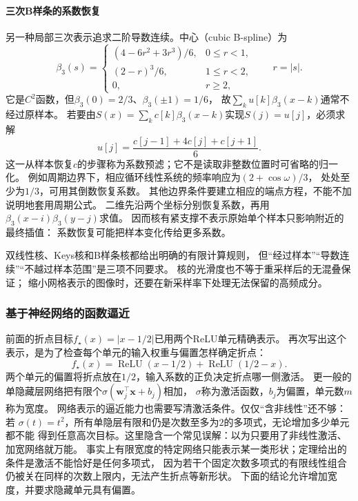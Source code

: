 \paragraph{三次B样条的系数恢复}
另一种局部三次表示追求二阶导数连续。中心（cubic B-spline）为
\[
 \beta_3(s)=
 \begin{cases}
 (4-6r^2+3r^3)/6,&0\leq r<1,\\
 (2-r)^3/6,&1\leq r<2,\\
 0,&r\geq2,
 \end{cases}\qquad r=|s|.
\]
它是$C^2$函数，但$\beta_3(0)=2/3$、$\beta_3(\pm1)=1/6$，
故$\sum_k u[k]\beta_3(x-k)$通常不经过原样本。
若要由$S(x)=\sum_k c[k]\beta_3(x-k)$实现$S(j)=u[j]$，必须求解
\begin{equation}
 u[j]=\frac{c[j-1]+4c[j]+c[j+1]}6.
 \label{eq:functional-cubic-bspline-prefilter}
\end{equation}
这一从样本恢复$c$的步骤称为系数预滤；它不是读取非整数位置时可省略的归一化。
例如周期边界下，相应循环线性系统的频率响应为$(2+\cos\omega)/3$，
处处至少为$1/3$，可用其倒数恢复系数。
其他边界条件要建立相应的端点方程，不能不加说明地套用周期公式。
二维先沿两个坐标分别恢复系数，再用$\beta_3(x-i)\beta_3(y-j)$求值。
因而核有紧支撑不表示原始单个样本只影响附近的最终插值：
系数恢复可能把样本变化传给更多系数。

双线性核、Keys核和B样条核都给出明确的有限计算规则，
但“经过样本”“导数连续”“不越过样本范围”是三项不同要求。
核的光滑度也不等于重采样后的无混叠保证；
缩小网格表示的图像时，还要在新采样率下处理无法保留的高频成分。

\subsubsection{基于神经网络的函数逼近}
\label{sec:functional-neural-approximation}

前面的折点目标$f_\star(x)=|x-1/2|$已用两个ReLU单元精确表示。
再次写出这个表示，是为了检查每个单元的输入权重与偏置怎样确定折点：
\[
 f_\star(x)=\operatorname{ReLU}(x-1/2)+\operatorname{ReLU}(1/2-x).
\]
两个单元的偏置将折点放在$1/2$，输入系数的正负决定折点哪一侧激活。
更一般的单隐藏层网络把有限个$\sigma(\bm w_j^\top\bm x+b_j)$相加，
$\sigma$称为激活函数，$b_j$为偏置，单元数$m$称为宽度。
网络表示的逼近能力也需要写清激活条件。仅仅“含非线性”还不够：若
$\sigma(t)=t^2$，所有单隐层有限和仍是次数至多为$2$的多项式，无论增加多少单元都不能
得到任意高次目标。这里隐含一个常见误解：以为只要用了非线性激活、加宽网络就万能。
事实上有限宽度的特定网络只能表示某一类形状；定理给出的条件是激活不能恰好是任何多项式，
因为若干个固定次数多项式的有限线性组合仍被关在同样的次数上限内，无法产生折点等新形状。
下面的结论允许增加宽度，并要求隐藏单元具有偏置。

